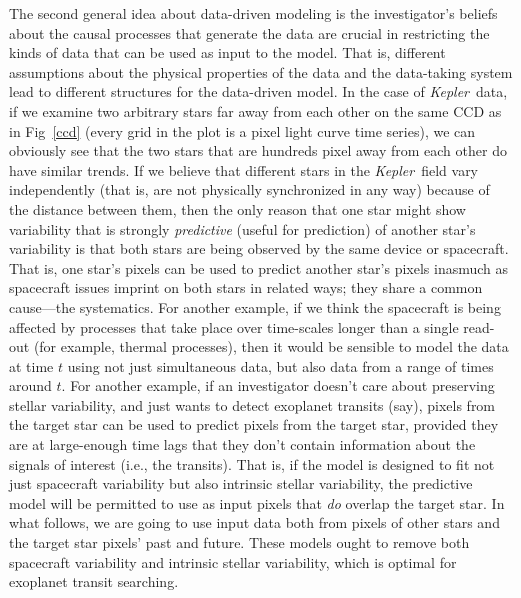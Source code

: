 \documentclass[12pt, preprint]{aastex}
\newcommand{\project}[1]{\textsl{#1}}
\newcommand{\Kepler}{\project{Kepler}}
\begin{document}
The second general idea about data-driven modeling is the investigator's beliefs
  about the causal processes that generate the data
  are crucial in restricting the kinds of data that can be used as input to the model.
That is, different assumptions about the physical properties of the data
  and the data-taking system
  lead to different structures for the data-driven model.
In the case of \Kepler\ data, if we examine two arbitrary stars far away from each other 
on the same CCD as in Fig~\ref{ccd} (every grid in the plot is a pixel light curve time 
series), we can obviously see that the two stars that are hundreds pixel away from each 
other do have similar trends. If we believe that different stars in the \Kepler\ field vary 
independently (that is, are not physically synchronized in any way) because of the 
distance between them, then the only reason that one star might show variability that is strongly \emph{predictive} (useful for prediction) of another star's variability
  is that both stars are being observed by the same device or spacecraft.
That is, one star's pixels can be used to predict another star's pixels
  inasmuch as spacecraft issues imprint on both stars in related ways;
  they share a common cause---the systematics.  
For another example, if we think the spacecraft is being affected by
  processes that take place over time-scales longer than a single read-out
  (for example, thermal processes),
  then it would be sensible to model the data at time $t$ using not just simultaneous data, but also data from a range of times around $t$.
For another example, if an investigator doesn't care about preserving stellar variability,
  and just wants to detect exoplanet transits (say),
  pixels from the target star can be used to predict pixels from the target star,
  provided they are at large-enough time lags that they don't contain information about
  the signals of interest (i.e., the transits).
That is, if the model is designed to fit not just spacecraft variability
  but also intrinsic stellar variability,
  the predictive model will be permitted to use as input pixels that \emph{do} overlap the 
  target star.
In what follows, we are going to use input data both from pixels of other stars and the  
target star pixels' past and future.
These models ought to remove both spacecraft variability and intrinsic stellar variability, 
which is optimal for exoplanet transit searching.
\end{document}
